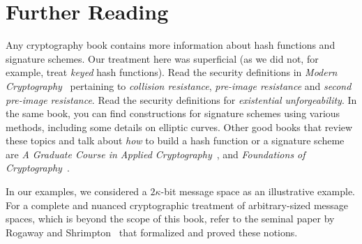 \section*{Further Reading}

Any cryptography book contains more information about hash functions and signature schemes.
Our treatment here was superficial (as we did not, for example, treat \emph{keyed} hash functions).
Read the security definitions in \emph{Modern Cryptography}~\cite{katz} pertaining to \emph{collision resistance},
\emph{pre-image resistance} and \emph{second pre-image resistance}. Read the security definitions
for \emph{existential unforgeability}. In the same book, you can find constructions for signature
schemes using various methods, including some details on elliptic curves.
Other good books that review these topics and talk about \emph{how} to build a hash function or
a signature scheme are
\emph{A Graduate Course in Applied Cryptography}~\cite{cryptobook},
and
\emph{Foundations of Cryptography}~\cite{foundations1,foundations2}.

In our examples, we considered a $2\kappa$-bit message space as an illustrative example.
For a complete and nuanced cryptographic treatment of arbitrary-sized message spaces,
which is beyond the scope of this book, refer to the seminal paper by
Rogaway and Shrimpton~\cite{rogaway2004cryptographic} that formalized and proved these notions.

